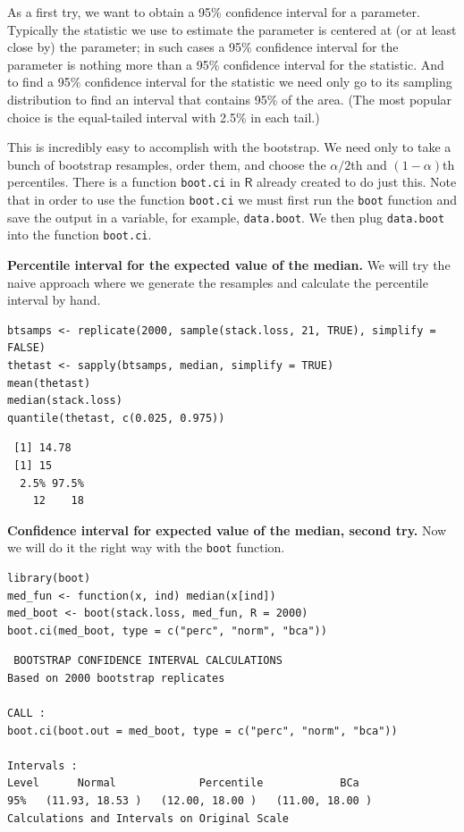 \documentclass[captions=tableheading]{scrbook}
\begin{document}
As a first try, we want to obtain a 95\% confidence interval for a parameter. Typically the statistic we use to estimate the parameter is centered at (or at least close by) the parameter; in such cases a 95\% confidence interval for the parameter is nothing more than a 95\% confidence interval for the statistic. And to find a 95\% confidence interval for the statistic we need only go to its sampling distribution to find an interval that contains 95\% of the area. (The most popular choice is the equal-tailed interval with 2.5\% in each tail.)

This is incredibly easy to accomplish with the bootstrap. We need only to take a bunch of bootstrap resamples, order them, and choose the \(\alpha/2\)th and \((1-\alpha)\)th percentiles. There is a function \texttt{boot.ci} in \(\mathsf{R}\) already created to do just this. Note that in order  to use the function \texttt{boot.ci} we must first run the \texttt{boot} function and save the output in a variable, for example, \texttt{data.boot}. We then plug \texttt{data.boot} into the function \texttt{boot.ci}.


\begin{example}

\textbf{Percentile interval for the expected value of the median.} We will try the naive approach where we generate the resamples and calculate the percentile interval by hand.


\lstset{language=R}
\begin{lstlisting}
btsamps <- replicate(2000, sample(stack.loss, 21, TRUE), simplify = FALSE)
thetast <- sapply(btsamps, median, simplify = TRUE)
mean(thetast)
median(stack.loss)
quantile(thetast, c(0.025, 0.975))
\end{lstlisting}

\begin{verbatim}
 [1] 14.78
 [1] 15
  2.5% 97.5% 
    12    18
\end{verbatim}

\end{example}

\begin{example}
\textbf{Confidence interval for expected value of the median, second try.}  Now we will do it the right way with the \texttt{boot} function.


\lstset{language=R}
\begin{lstlisting}
library(boot)
med_fun <- function(x, ind) median(x[ind])
med_boot <- boot(stack.loss, med_fun, R = 2000)
boot.ci(med_boot, type = c("perc", "norm", "bca"))
\end{lstlisting}


\begin{verbatim}
 BOOTSTRAP CONFIDENCE INTERVAL CALCULATIONS
Based on 2000 bootstrap replicates

CALL : 
boot.ci(boot.out = med_boot, type = c("perc", "norm", "bca"))

Intervals : 
Level      Normal             Percentile            BCa          
95%   (11.93, 18.53 )   (12.00, 18.00 )   (11.00, 18.00 )  
Calculations and Intervals on Original Scale
\end{verbatim}

\end{example}
\end{document}
